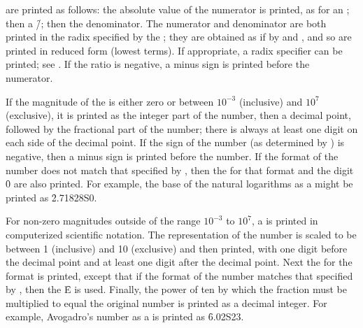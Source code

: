\endsubsubsection%

 are printed as follows:
the absolute value of the numerator is printed, as for an ;
then a \f{/}; then the denominator.  The numerator and denominator are
both printed in the radix specified by the ; 
they are obtained as if by
 and , and so 
are printed in reduced form (lowest terms).
If appropriate, a radix specifier can be printed; see 
.
If the ratio is negative, a minus sign is printed before the numerator.

\endsubsubsection%

If the magnitude of the  is either zero or between $10^{-3}$ (inclusive)
and $10^7$ (exclusive), it is printed as the integer part of the number,
then a decimal point,
followed by the fractional part of the number;
there is always at least one
digit on each side of the decimal point.    
If the sign of the number
(as determined by )
is negative, then a minus sign is printed before the number.
If the format of the number
does not match that specified by
, then the  for
that format and the digit \f{0} are also printed.
For example, the base of the natural logarithms as a 
might be printed as \f{2.71828S0}.

For non-zero magnitudes outside of the range $10^{-3}$ to $10^7$,
a  is printed in computerized scientific notation.
The representation of the number is scaled to be between
1 (inclusive) and 10 (exclusive) and then printed, with one digit
before the decimal point and at least one digit after the decimal point.
Next the  for the format is printed,
except that
if the format of the number matches that specified by 
, then the  \f{E}
is used.
Finally, the power of ten by which the fraction must be multiplied
to equal the original number is printed as a decimal integer.
For example, Avogadro's number as a  
is printed as \f{6.02S23}.


